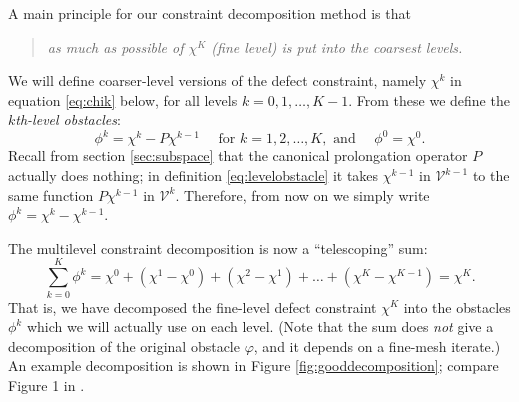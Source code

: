 \documentclass[letterpaper,final,12pt,reqno]{amsart}
\numberwithin{equation}{section}
\numberwithin{figure}{section}
\numberwithin{table}{section}
\begin{document}
A main principle for our constraint decomposition method is that
\begin{quote}
\emph{as much as possible of $\chi^K$ (fine level) is put into the coarsest levels.}
\end{quote}
We will define coarser-level versions of the defect constraint, namely $\chi^k$ in equation \eqref{eq:chik} below, for all levels $k=0,1,\dots,K-1$.  From these we define the \emph{$k$th-level obstacles}:
\begin{equation}
  \phi^k = \chi^k - P\chi^{k-1} \quad \text{ for } k=1,2,\dots,K, \text{ and } \quad \phi^0 = \chi^0.  \label{eq:levelobstacle}
\end{equation}
Recall from section \ref{sec:subspace} that the canonical prolongation operator $P$ actually does nothing; in definition \eqref{eq:levelobstacle} it takes $\chi^{k-1}$ in $\mathcal{V}^{k-1}$ to the same function $P\chi^{k-1}$ in $\mathcal{V}^k$.  Therefore, from now on we simply write $\phi^k = \chi^k - \chi^{k-1}$.

The multilevel constraint decomposition is now a ``telescoping'' sum:
\begin{equation}
  \sum_{k=0}^K \phi^k = \chi^0 + (\chi^1 - \chi^0) + (\chi^2 - \chi^1) + \dots + (\chi^K - \chi^{K-1}) = \chi^K.  \label{eq:telescopingdecomposition}
\end{equation}
That is, we have decomposed the fine-level defect constraint $\chi^K$ into the obstacles $\phi^k$ which we will actually use on each level.  (Note that the sum does \emph{not} give a decomposition of the original obstacle $\varphi$, and it depends on a fine-mesh iterate.)  An example decomposition is shown in Figure \ref{fig:gooddecomposition}; compare Figure 1 in \cite{GraeserKornhuber2009}.
\end{document}
